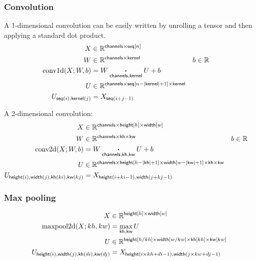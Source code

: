\documentclass{article}
\newcommand{\reals}{\mathbb{R}}
\begin{document}
\subsubsection{Convolution}

A 1-dimensional convolution can be easily written by unrolling a tensor and then
applying a standard dot product.
\begin{align*}
X &\in \reals^{\name{channels} \times \nset{seq}{n}}  \\
W &\in \reals^{\name{channels} \times \name{kernel}} &
b &\in \reals \\
\text{conv1d}(X; W, b) &= W \ndot{channels, kernel} U + b \\
U &\in \reals^{\name{channels} \times \nset{seq}{n-|\name{kernel}|+1} \times \name{kernel}}  \\
U_{\nidx{seq}{i}, \nidx{kernel}{j}} & = X_{\nidx{seq}{i+j - 1}}  
\end{align*} 

A 2-dimensional convolution:
\begin{align*}
X &\in \reals^{\name{channels} \times \nset{height}{h} \times \nset{width}{w}} \\
W &\in \reals^{\name{channels} \times \name{kh} \times \name{kw}} &
b &\in \reals \\
\text{conv2d}(X; W, b) &=  W \ndot{channels, kh, kw} U + b \\
U &\in \reals^{\name{channels} \times \nset{height}{h-|\name{kh}|+1} \times
\nset{width}{w-|\name{kw}|+1} \times \name{kh} \times \name{kw}}  \\
U_{\nidx{height}{i}, \nidx{width}{j}, \nidx{kh}{ki}, \nidx{kw}{kj}} &= X_{\nidx{height}{i+ki-1}, \nidx{width}{j+kj-1}}  
\end{align*}

\subsubsection{Max pooling}

\begin{align*}
X &\in \reals^{\nset{height}{h} \times \nset{width}{w}} \\
\text{maxpool2d}(X; kh, kw) &=  \nfun{kh, kw}{max} U \\
U &\in \reals^{{\nset{height}{h / kh} \times \nset{width}{w / kw} \times \nset{kh}{kh} \times \nset{kw}{kw}}} \\
U_{\nidx{height}{i}, \nidx{width}{j}, \nidx{kh}{di}, \nidx{kw}{dj}} & = X_{\nidx{height}{i \times kh + di -1}, \nidx{width}{j \times kw + dj -1}}  
\end{align*}
\end{document}
